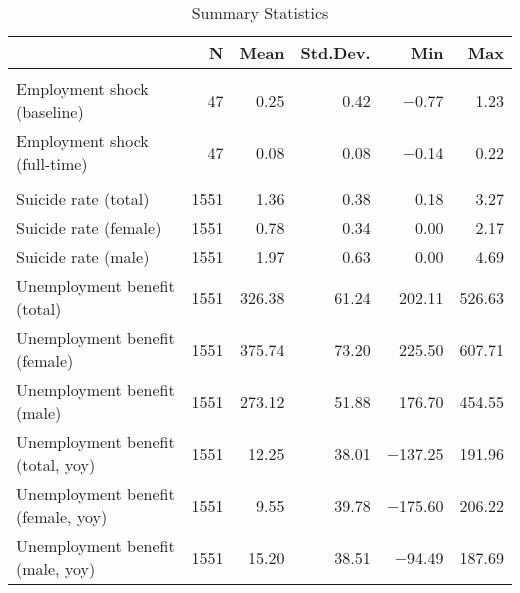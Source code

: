 \begin{table}

\begin{threeparttable}
\caption{\label{tab:summary_stat}Summary Statistics}
\centering
\begin{tabular}[t]{lrrrrr}
\toprule
  & N & Mean & Std.Dev. & Min & Max\\
\midrule
\addlinespace[0.3em]
\multicolumn{6}{l}{\textbf{Treatment}}\\
\hspace{1em}Employment shock (baseline) & 47 & \num{0.25} & \num{0.42} & \num{-0.77} & \num{1.23}\\
\hspace{1em}Employment shock (full-time) & 47 & \num{0.08} & \num{0.08} & \num{-0.14} & \num{0.22}\\
\addlinespace[0.3em]
\multicolumn{6}{l}{\textbf{Outcome}}\\
\hspace{1em}Suicide rate (total) & 1551 & \num{1.36} & \num{0.38} & \num{0.18} & \num{3.27}\\
\hspace{1em}Suicide rate (female) & 1551 & \num{0.78} & \num{0.34} & \num{0.00} & \num{2.17}\\
\hspace{1em}Suicide rate (male) & 1551 & \num{1.97} & \num{0.63} & \num{0.00} & \num{4.69}\\
\hspace{1em}Unemployment benefit (total) & 1551 & \num{326.38} & \num{61.24} & \num{202.11} & \num{526.63}\\
\hspace{1em}Unemployment benefit (female) & 1551 & \num{375.74} & \num{73.20} & \num{225.50} & \num{607.71}\\
\hspace{1em}Unemployment benefit (male) & 1551 & \num{273.12} & \num{51.88} & \num{176.70} & \num{454.55}\\
\hspace{1em}Unemployment benefit (total, yoy) & 1551 & \num{12.25} & \num{38.01} & \num{-137.25} & \num{191.96}\\
\hspace{1em}Unemployment benefit (female, yoy) & 1551 & \num{9.55} & \num{39.78} & \num{-175.60} & \num{206.22}\\
\hspace{1em}Unemployment benefit (male, yoy) & 1551 & \num{15.20} & \num{38.51} & \num{-94.49} & \num{187.69}\\

\end{tabular}
\end{threeparttable}
\end{table}
